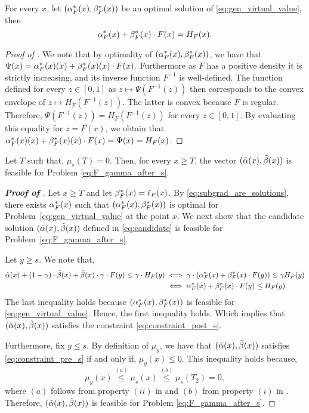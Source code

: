 \begin{lemma}
\label{lem:charac_PsiF}
For every $x$, let $(\alpha^*_F(x),\beta^*_F(x))$ be an optimal solution of \eqref{eq:gen_virtual_value}, then
\begin{equation*}	
\alpha^*_F(x) + \beta^*_F(x) \cdot F(x) = H_{F}(x).
\end{equation*}
\end{lemma}
\begin{proof}[Proof of ]
We note that by optimality of $(\alpha^*_F(x),\beta^*_F(x))$, we have that $\Psi(x) = \alpha^*_F(x)(x) + \beta^*_F(x)(x) \cdot F(x).$ Furthermore as $F$ has a positive density it is strictly increasing, and its inverse function $F^{-1}$ is well-defined. The function defined for every $z \in [0,1]$ as $z \mapsto \Psi(F^{-1}(z))$ then corresponds to the convex envelope of $z \mapsto H_{F}(F^{-1}(z))$. The latter is convex because $F$ is regular. Therefore, $\Psi(F^{-1}(z)) = H_{F}(F^{-1}(z))$ for every $z \in [0,1]$. By evaluating this equality for $z = F(x)$, we obtain that $\alpha^*_F(x)(x) + \beta^*_F(x)(x) \cdot F(x) = \Psi(x) = H_{F}(x)$.
\end{proof}

\begin{lemma}	
\label{lem:feasible_post_T}
Let $T$ such that, $\mu_s(T) = 0$. Then, for every $x \geq T$, the vector $(\tilde{\alpha}(x),\tilde{\beta}(x))$ is feasible for Problem \eqref{eq:F_gamma_after_s}.
\end{lemma}
\begin{proof}[\textbf{Proof of }]

Let $x \geq T$ and let $\beta^*_F(x) = \ell_F(x)$. By \eqref{eq:subgrad_are_solutions}, there exists $\alpha^*_F(x)$ such that $(\alpha^*_F(x),\beta^*_F(x))$ is optimal for Problem~\eqref{eq:gen_virtual_value} at the point $x$. We next show that the candidate solution $(\tilde{\alpha}(x),\tilde{\beta}(x))$ defined in \eqref{eq:candidate} is feasible for Problem~\eqref{eq:F_gamma_after_s}.

Let $y \geq s$. We note that,
\begin{align*}
\tilde{\alpha}(x) + (1-\gamma) \cdot \tilde{\beta}(x) + \tilde{\beta}(x) \cdot \gamma \cdot F(y) \leq \gamma \cdot H_{F}(y) &\iff \gamma \cdot \left(  \alpha^*_F(x) + \beta^*_F(x) \cdot F(y) \right) \leq \gamma H_{F}(y) \\
&\iff \alpha^*_F(x) + \beta^*_F(x) \cdot F(y)  \leq H_{F}(y).
\end{align*}
The last inequality holds because $(\alpha^*_F(x),\beta^*_F(x))$ is feasible for \eqref{eq:gen_virtual_value}. Hence, the first inequality holds. Which implies that $(\tilde{\alpha}(x),\tilde{\beta}(x))$ satisfies the constraint \eqref{eq:constraint_post_s}.

Furthermore, fix $y \leq s$. By definition of $\mu_y$, we have that $(\tilde{\alpha}(x),\tilde{\beta}(x))$ satisfies \eqref{eq:constraint_pre_s} if and only if, $\mu_y(x) \leq 0.$ This inequality holds because,
\begin{equation*}
\mu_y(x) \stackrel{(a)}{\leq} \mu_s(x) \stackrel{(b)}{\leq} \mu_s(T_2) = 0, 
\end{equation*}
where $(a)$ follows from property $(ii)$ in  and $(b)$ from property $(i)$ in .
Therefore, $(\tilde{\alpha}(x),\tilde{\beta}(x))$ is feasible for Problem \eqref{eq:F_gamma_after_s}.

\end{proof}

